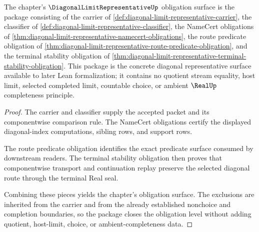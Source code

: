 \begin{theorem}
\label{thm:diagonal-limit-representative-obligation-closure-package}
The chapter's $\DiagonalLimitRepresentativeUp$ obligation surface is the package consisting of the carrier of \autoref{def:diagonal-limit-representative-carrier}, the classifier of \autoref{def:diagonal-limit-representative-classifier}, the NameCert obligations of \autoref{thm:diagonal-limit-representative-namecert-obligations}, the route predicate obligation of \autoref{thm:diagonal-limit-representative-route-predicate-obligation}, and the terminal stability obligation of \autoref{thm:diagonal-limit-representative-terminal-stability-obligation}. This package is the concrete diagonal representative surface available to later Lean formalization; it contains no quotient stream equality, host limit, selected completed limit, countable choice, or ambient $\RealUp$ completeness principle.
\end{theorem}
\begin{proof}
The carrier and classifier supply the accepted packet and its componentwise comparison rule. The NameCert obligations certify the displayed diagonal-index computations, sibling rows, and support rows.

The route predicate obligation identifies the exact predicate surface consumed by downstream readers. The terminal stability obligation then proves that componentwise transport and continuation replay preserve the selected diagonal route through the terminal Real seal.

Combining these pieces yields the chapter's obligation surface. The exclusions are inherited from the carrier and from the already established nonchoice and completion boundaries, so the package closes the obligation level without adding quotient, host-limit, choice, or ambient-completeness data.
\end{proof}

